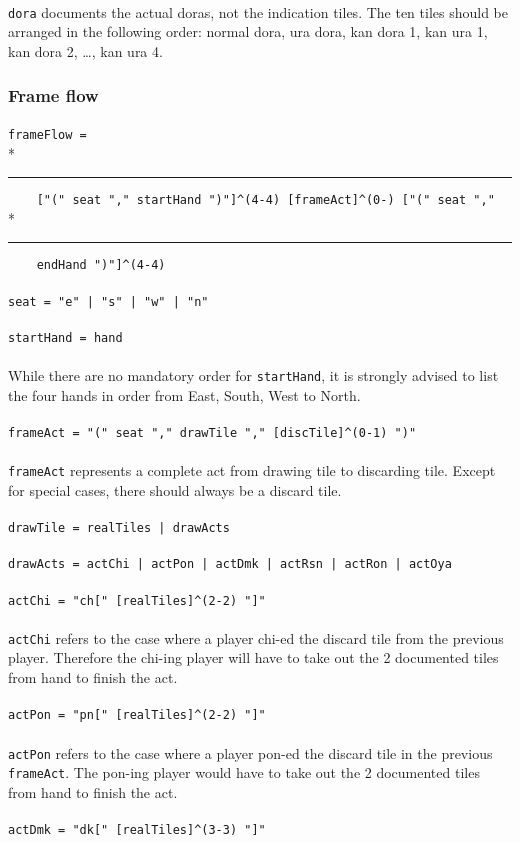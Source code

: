 \documentclass[%
	a4paper%
	,10pt%
	,twoside%
	,notitlepage%
]{article}%
\newcommand*{\ruleSymbol}{\textjapanese{⚠}}%
\newcommand*{\ruleMargin}{\marginpar{\flushright{}\ruleSymbol{}}}%
\newcommand*{\rulePar}{\paragraph*{\ruleMargin{}}}%
\newcommand*{\indentRule}{\rule{10pt}{0pt}}%
\begin{document}
			\paragraph*{}\lstinline/dora/ documents the actual doras, not the indication tiles. The ten tiles should be arranged in the following order: normal dora, ura dora, kan dora 1, kan ura 1, kan dora 2, \dots{}, kan ura 4. %
		\subsubsection{Frame flow}\label{subsubsec:frmflow}%
			\rulePar{}\lstinline/frameFlow = /\\*{}%
			\indentRule{}\lstinline/    ["(" seat "," startHand ")"]^(4-4) [frameAct]^(0-) ["(" seat "," /\\*{}%
			\indentRule{}\lstinline/    endHand ")"]^(4-4)/%
			\rulePar{}\lstinline/seat = "e" | "s" | "w" | "n"/%
			\rulePar{}\lstinline/startHand = hand/%
			\paragraph*{}While there are no mandatory order for \lstinline/startHand/, it is strongly advised to list the four hands in order from East, South, West to North. %
			\rulePar{}\lstinline/frameAct = "(" seat "," drawTile "," [discTile]^(0-1) ")"/%
			\paragraph*{}\lstinline/frameAct/ represents a complete act from drawing tile to discarding tile. Except for special cases, there should always be a discard tile. %
			\rulePar{}\lstinline/drawTile = realTiles | drawActs/%
			\rulePar{}\lstinline/drawActs = actChi | actPon | actDmk | actRsn | actRon | actOya /%
			\rulePar{}\lstinline/actChi = "ch[" [realTiles]^(2-2) "]"/%
			\paragraph*{}\lstinline/actChi/ refers to the case where a player chi-ed the discard tile from the previous player. Therefore the chi-ing player will have to take out the 2 documented tiles from hand to finish the act. %
			\rulePar{}\lstinline/actPon = "pn[" [realTiles]^(2-2) "]"/%
			\paragraph*{}\lstinline/actPon/ refers to the case where a player pon-ed the discard tile in the previous \lstinline/frameAct/. The pon-ing player would have to take out the 2 documented tiles from hand to finish the act. %
			\rulePar{}\lstinline/actDmk = "dk[" [realTiles]^(3-3) "]"/%
\end{document}
